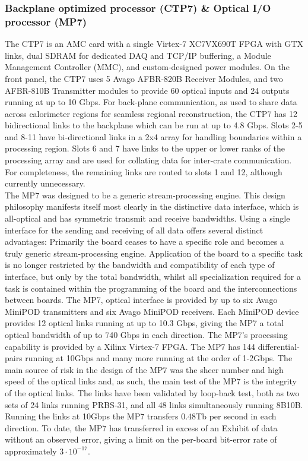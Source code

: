 \subsubsection{Backplane optimized processor (CTP7) \& Optical I/O processor (MP7)}
The CTP7 is an AMC card with a single Virtex-7 XC7VX690T FPGA with GTX links, dual SDRAM for dedicated DAQ and TCP/IP buffering, a Module Management Controller (MMC), and custom-designed power modules. On the front panel, the CTP7 uses 5 Avago AFBR-820B Receiver Modules, and two AFBR-810B Transmitter modules to provide 60 optical inputs and 24 outputs running at up to 10 Gbps. For back-plane communication, as used to share data across calorimeter regions for seamless regional reconstruction, the CTP7 has 12 bidirectional links to the backplane which can be run at up to 4.8 Gbps. Slots 2-5 and 8-11 have bi-directional links in a 2x4 array for handling boundaries within a processing region. Slots 6 and 7 have links to the upper or lower ranks of the processing array and are used for collating data for inter-crate communication. For completeness, the remaining links are routed to slots 1 and 12, although currently unnecessary.\\

The MP7 was designed to be a generic stream-processing engine. This design philosophy manifests itself most clearly in the distinctive data interface, which is all-optical and has symmetric transmit and receive bandwidths. Using a single interface for the sending and receiving of all data offers several distinct advantages: Primarily the board ceases to have a specific role and becomes a truly generic stream-processing engine. Application of the board to a specific task is no longer restricted by the bandwidth and compatibility of each type of interface, but only by the total bandwidth, whilst all specialization required for a task is contained within the programming of the board and the interconnections between boards. The MP7‚ optical interface is provided by up to six Avago MiniPOD transmitters and six Avago MiniPOD receivers. Each MiniPOD device provides 12 optical links running at up to 10.3 Gbps, giving the MP7 a total optical bandwidth of up to 740 Gbps in each direction. The MP7's processing capability is provided by a Xilinx Virtex-7 FPGA. The MP7 has 144 differential-pairs running at 10Gbps and many more running at the order of 1-2Gbps.  The main source of risk in the design of the MP7 was the sheer number and high speed of the optical links and, as such, the main test of the MP7 is the integrity of the optical links. The links have been validated by loop-back test, both as two sets of 24 links running PRBS-31, and all 48 links simultaneously running 8B10B. Running the links at 10Gbps the MP7 transfers 0.48Tb per second in each direction. To date, the MP7 has transferred in excess of an Exhibit of data without an observed error, giving a limit on the per-board bit-error rate of approximately $3\cdot 10^{-17}$.


